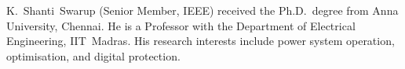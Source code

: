 \documentclass[10pt,journal,twoside]{IEEEtran}
\begin{document}
\begin{IEEEbiographynophoto}{K.~Shanti~Swarup}
(Senior Member, IEEE) received the Ph.D.\ degree from Anna University,
Chennai.  He is a Professor with the Department of Electrical Engineering,
IIT~Madras.  His research interests include power system operation,
optimisation, and digital protection.
\end{IEEEbiographynophoto}



\end{document}
